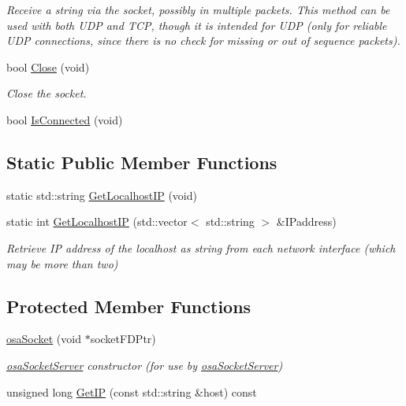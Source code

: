 \begin{DoxyCompactItemize}
\begin{DoxyCompactList}\small\item\em Receive a string via the socket, possibly in multiple packets. This method can be used with both U\-D\-P and T\-C\-P, though it is intended for U\-D\-P (only for reliable U\-D\-P connections, since there is no check for missing or out of sequence packets). \end{DoxyCompactList}\item 
bool \hyperlink{classosa_socket_acaf1869eba7f202d3955bdd58de79503}{Close} (void)
\begin{DoxyCompactList}\small\item\em Close the socket. \end{DoxyCompactList}\item 
bool \hyperlink{classosa_socket_aabe0c123217596854f4f912b04d4e2f2}{Is\-Connected} (void)
\end{DoxyCompactItemize}
\subsection*{Static Public Member Functions}
\begin{DoxyCompactItemize}
\item 
static std\-::string \hyperlink{classosa_socket_a733e1bbf1236424b9345c56d4436b9f4}{Get\-Localhost\-I\-P} (void)
\item 
static int \hyperlink{classosa_socket_a4819601ae4e72f6695dc61781b4fc73c}{Get\-Localhost\-I\-P} (std\-::vector$<$ std\-::string $>$ \&I\-Paddress)
\begin{DoxyCompactList}\small\item\em Retrieve I\-P address of the localhost as string from each network interface (which may be more than two) \end{DoxyCompactList}\end{DoxyCompactItemize}
\subsection*{Protected Member Functions}
\begin{DoxyCompactItemize}
\item 
\hyperlink{classosa_socket_ad52fa55231168bf731ed495cc89405ff}{osa\-Socket} (void $\ast$socket\-F\-D\-Ptr)
\begin{DoxyCompactList}\small\item\em \hyperlink{classosa_socket_server}{osa\-Socket\-Server} constructor (for use by \hyperlink{classosa_socket_server}{osa\-Socket\-Server}) \end{DoxyCompactList}\item 
unsigned long \hyperlink{classosa_socket_a98e6b0d1fe72490b6163fa439c27a10b}{Get\-I\-P} (const std\-::string \&host) const 
\end{DoxyCompactItemize}
